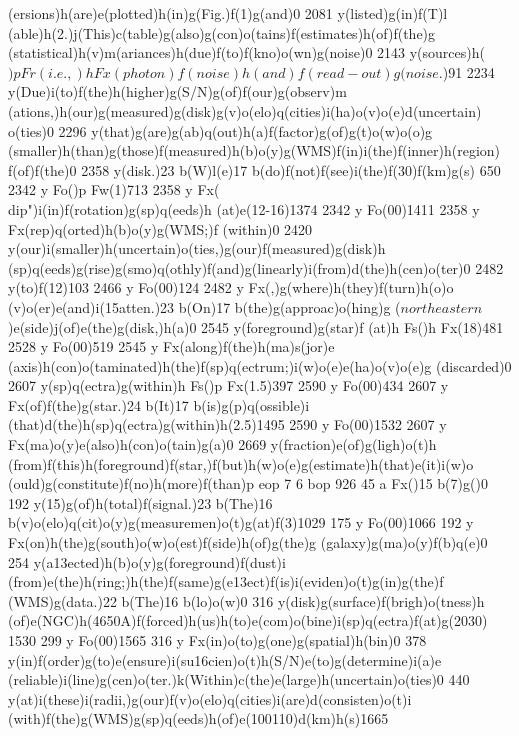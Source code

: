 {{{{{{{{{{{{(ersions)h(are)e(plotted)h(in)g(Fig.)f(1)g(and)0 2081 y(listed)g(in)f(T)l
(able)h(2.)j(This)c(table)g(also)g(con)o(tains)f(estimates)h(of)f(the)g
(statistical)h(v)m(ariances)h(due)f(to)f(kno)o(wn)g(noise)0
2143 y(sources)h(\()p Fr(i.e.,)h Fx(photon)f(noise)h(and)f(read-out)g
(noise\).)91 2234 y(Due)i(to)f(the)h(higher)g(S/N)g(of)f(our)g(observ)m
(ations,)h(our)g(measured)g(disk)g(v)o(elo)q(cities)i(ha)o(v)o(e)d(uncertain)
o(ties)0 2296 y(that)g(are)g(ab)q(out)h(a)f(factor)g(of)g(t)o(w)o(o)g
(smaller)h(than)g(those)f(measured)h(b)o(y)g(WMS)f(in)i(the)f(inner)h(region)
f(of)f(the)0 2358 y(disk.)23 b(W)l(e)17 b(do)f(not)f(see)i(the)f(30)f(km)g(s)
650 2342 y Fo()p Fw(1)713 2358 y Fx(\\dip")i(in)f(rotation)g(sp)q(eeds)h
(at)e(12-16)1374 2342 y Fo(00)1411 2358 y Fx(rep)q(orted)h(b)o(y)g(WMS;)f
(within)0 2420 y(our)i(smaller)h(uncertain)o(ties,)g(our)f(measured)g(disk)h
(sp)q(eeds)g(rise)g(smo)q(othly)f(and)g(linearly)i(from)d(the)h(cen)o(ter)0
2482 y(to)f(12)103 2466 y Fo(00)124 2482 y Fx(,)g(where)h(they)f(turn)h(o)o
(v)o(er)e(and)i(\015atten.)23 b(On)17 b(the)g(approac)o(hing)g
(\(northeastern\))e(side)j(of)e(the)g(disk,)h(a)0 2545 y(foreground)g(star)f
(at)h Fs()h Fx(18)481 2528 y Fo(00)519 2545 y Fx(along)f(the)h(ma)s(jor)e
(axis)h(con)o(taminated)h(the)f(sp)q(ectrum;)i(w)o(e)e(ha)o(v)o(e)g
(discarded)0 2607 y(sp)q(ectra)g(within)h Fs()p Fx(1.5)397
2590 y Fo(00)434 2607 y Fx(of)f(the)g(star.)24 b(It)17 b(is)g(p)q(ossible)i
(that)d(the)h(sp)q(ectra)g(within)h(2.5)1495 2590 y Fo(00)1532
2607 y Fx(ma)o(y)e(also)h(con)o(tain)g(a)0 2669 y(fraction)e(of)g(ligh)o(t)h
(from)f(this)h(foreground)f(star,)f(but)h(w)o(e)g(estimate)h(that)e(it)i(w)o
(ould)g(constitute)f(no)h(more)f(than)p eop
7 6 bop 926 45 a Fx({)15 b(7)g({)0 192 y(15)g(of)h(total)f(signal.)23
b(The)16 b(v)o(elo)q(cit)o(y)g(measuremen)o(t)g(at)f(3)1029
175 y Fo(00)1066 192 y Fx(on)h(the)g(south)o(w)o(est)f(side)h(of)g(the)g
(galaxy)g(ma)o(y)f(b)q(e)0 254 y(a\013ected)h(b)o(y)g(foreground)f(dust)i
(from)e(the)h(ring;)h(the)f(same)g(e\013ect)f(is)i(eviden)o(t)g(in)g(the)f
(WMS)g(data.)22 b(The)16 b(lo)o(w)0 316 y(disk)g(surface)f(brigh)o(tness)h
(of)e(NGC)h(4650A)f(forced)h(us)h(to)e(com)o(bine)i(sp)q(ectra)f(at)g(20{30)
1530 299 y Fo(00)1565 316 y Fx(in)o(to)g(one)g(spatial)h(bin)0
378 y(in)f(order)g(to)e(ensure)i(su\016cien)o(t)h(S/N)e(to)g(determine)i(a)e
(reliable)i(line)g(cen)o(ter.)k(Within)c(the)e(large)h(uncertain)o(ties)0
440 y(at)i(these)i(radii,)g(our)f(v)o(elo)q(cities)i(are)d(consisten)o(t)i
(with)f(the)g(WMS)g(sp)q(eeds)h(of)e(100{110)d(km)h(s)1665
}}}}}}}}}}}}}}}}
